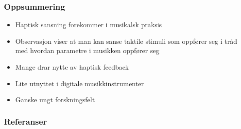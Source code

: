 \documentclass{beamer}
\begin{document}
\begin{frame}
	\frametitle{Oppsummering}
	\begin{itemize}
		\item Haptisk sansning forekommer i musikalsk praksis
		\item Observasjon viser at man kan sanse taktile stimuli som oppfører seg i tråd med hvordan parametre i musikken oppfører seg
		\item Mange drar nytte av haptisk feedback
		\item Lite utnyttet i digitale musikkinstrumenter
		\item Ganske ungt forskningsfelt
	\end{itemize}
\end{frame}

\begin{frame}[allowframebreaks]
	\frametitle{Referanser}
	
	
\end{frame}
\end{document}
